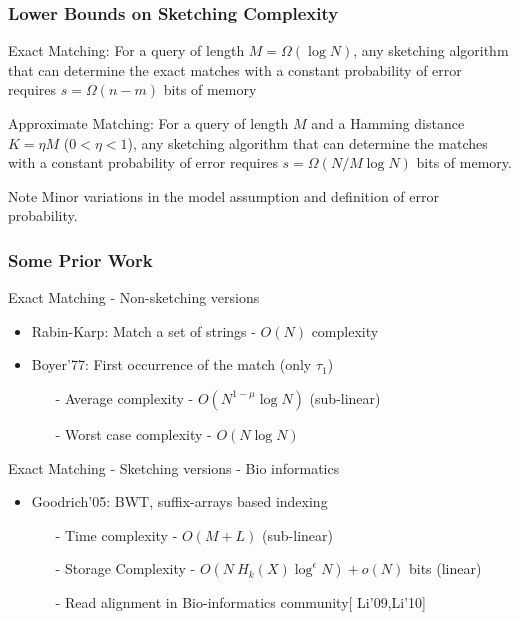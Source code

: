 \documentclass[10pt,xcolor=table]{beamer}
\begin{document}
\begin{frame} \frametitle{Lower Bounds on Sketching Complexity}
	\begin{block}{Exact Matching:}
		For a query of length $M = \Omega(\log N)$, any sketching algorithm that can determine the exact matches with a constant probability of error requires \alert{$s = \Omega(n-m)$} bits of memory
	\end{block}
	
	\begin{block}{Approximate Matching:}
		For a query of length $M$ and a Hamming distance $K= \eta M$ ($0<\eta<1$), any sketching algorithm that can determine the matches with a constant probability of error requires \alert{$s = \Omega (N/M \log N)$} bits of memory.
	\end{block}
	
	\begin{block}{Note}
		 Minor variations in the model assumption and definition of error probability.
	\end{block}
\end{frame}
\begin{frame} \frametitle{Some Prior Work}
	\vspace{-0.2cm}
	 \begin{block}{Exact Matching - Non-sketching versions}	 	
	 	\begin{itemize}
            \item  {Rabin-Karp}: Match a set of strings - $O(N)$ complexity
	 		\item  {Boyer'77}: First occurrence of the match (only $\tau_1$)	 		
	 		\begin{itemize}
	 			\item[-] Average complexity - $O(N^{1-\mu} \log N)$ (sub-linear)
	 			\item[-] Worst case complexity - $O(N \log N)$
	 		\end{itemize}	
	 	\end{itemize}
	 \end{block}
	 
	 \begin{block}{Exact Matching - Sketching versions - Bio informatics} 	
	 	\begin{itemize}
	 		\item  {Goodrich'05}: BWT, suffix-arrays based indexing
	 		\begin{itemize}
	 			\item[-] Time complexity - $O(M + L)$ (sub-linear)
	 			\item[-] Storage Complexity - $O(N~H_k(X) \log^\epsilon N) + o(N)$ bits  (linear)
	 			\item[-] Read alignment in Bio-informatics community[ {\color{blue}Li'09,Li'10}]
	 		\end{itemize}	 		
	 	\end{itemize}
	 \end{block}
\end{frame}
\end{document}

